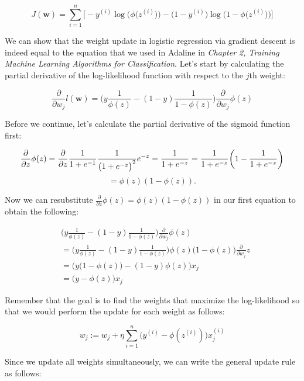 \documentclass[letterpaper]{report}
\begin{document}
\[
J(\mathbf{w}) = \sum_{i=1}^{n} \Bigg[- y^{(i)} \log \bigg(\phi \big( z^{(i)} \big) \bigg) - \bigg(1 - y^{(i)} \bigg) \log \bigg( 1 - \phi \big( z^{(i)} \big) \bigg)  \Bigg]
\]

We can show that the weight update in logistic regression via gradient descent is indeed equal to the equation that we used in Adaline in \textit{Chapter 2, Training Machine Learning Algorithms for Classification}. Let's start by calculating the partial derivative of the log-likelihood function with respect to the $j$th weight:

\[
\frac{\partial}{\partial w_j} l(\mathbf{w}) = \Bigg( y \frac{1}{\phi(z)}  - (1-y) \frac{1}{1-\phi(z)}   \Bigg)   \frac{\partial}{\partial w_j} \phi(z)
\]

Before we continue, let's calculate the partial derivative of the sigmoid function  first:

\[
\frac{\partial}{\partial z} \phi(z) = \frac{\partial}{\partial z} \frac{1}{1 + e^{-1}} \frac{1}{\big( 1 + e^{-z}\big)^2} e^{-z} = \frac{1}{1 + e^{-z}} = \frac{1}{1 + e^{-z}} \bigg( 1 - \frac{1}{1 + e^{-z}} \bigg) \\\\
\]
\[
= \phi(z)(1-\phi(z)).
\]

Now we can resubstitute $\frac{\partial}{\partial z} \phi(z) = \phi(z)(1-\phi(z))$ in our first equation to obtain the following:

\begin{equation*} 
\begin{split}
& \Bigg( y \frac{1}{\phi(z)} - (1-y) \frac{1}{1-\phi(z)} \Bigg) \frac{\partial}{\partial w_j} \phi(z) \\
& = \Bigg( y \frac{1}{\phi(z)} - (1-y) \frac{1}{1-\phi(z)} \Bigg) \phi(z) \big(1 - \phi(z)\big) \frac{\partial}{\partial w_j} z \\
& = \bigg(  y \big( 1 - \phi(z)   \big) - (1-y) \phi(z)  \bigg) x_j \\
& = \big( y - \phi(z)  \big) x_j
\end{split}
\end{equation*}

Remember that the goal is to find the weights that maximize the log-likelihood so that we would perform the update for each weight as follows:

\[
w_j := w_j + \eta \sum_{i=1}^{n} \bigg( y^{(i)} - \phi(z^{(i)}) \bigg) x_{j}^{(i)}
\]

Since we update all weights simultaneously, we can write the general update rule as follows:
\end{document}

